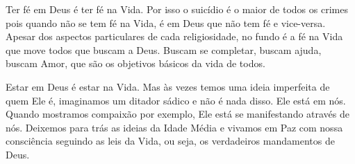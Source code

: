 \emdash{}Ter fé em Deus é ter fé na Vida. Por isso o suicídio é o maior de todos os crimes pois quando não se tem fé na Vida, é em Deus que não tem fé e vice-versa. Apesar dos aspectos particulares de cada religiosidade, no fundo é a fé na Vida que move todos que buscam a Deus. Buscam se completar, buscam ajuda, buscam Amor, que são os objetivos básicos da vida de todos.

\emdash{}Estar em Deus é estar na Vida. Mas às vezes temos uma ideia imperfeita de quem Ele é, imaginamos um ditador sádico e não é nada disso. Ele está em nós. Quando mostramos compaixão por exemplo, Ele está se manifestando através de nós. Deixemos para trás as ideias da Idade Média e vivamos em Paz com nossa consciência seguindo as leis da Vida, ou seja, os verdadeiros mandamentos de Deus.